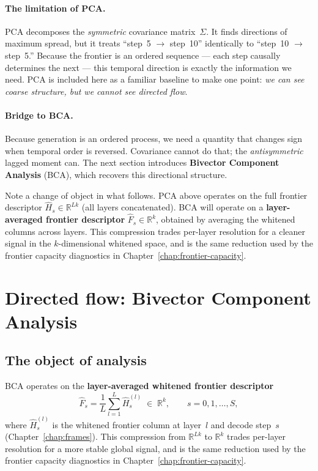 \documentclass[11pt, twoside, openright]{memoir}
\numberwithin{equation}{chapter}
\begin{document}
\paragraph{The limitation of PCA.}
PCA decomposes the \emph{symmetric} covariance matrix~$\Sigma$.  It
finds directions of maximum spread, but it treats
``step~5 $\to$ step~10'' identically to ``step~10 $\to$ step~5.''
Because the frontier is an ordered sequence --- each step causally
determines the next --- this temporal direction is exactly the
information we need.  PCA is included here as a familiar baseline to
make one point: \emph{we can see coarse structure, but we cannot
see directed flow}.

\paragraph{Bridge to BCA.}
Because generation is an ordered process, we need a quantity that
changes sign when temporal order is reversed.  Covariance cannot do
that; the \emph{antisymmetric} lagged moment can.  The next section
introduces \textbf{Bivector Component Analysis} (BCA), which
recovers this directional structure.

Note a change of object in what follows.  PCA above operates on the
full frontier descriptor $\hat{H}_s \in \mathbb{R}^{Lk}$ (all layers
concatenated).  BCA will operate on a \textbf{layer-averaged
frontier descriptor} $\hat{F}_s \in \mathbb{R}^k$, obtained by
averaging the whitened columns across layers.  This compression
trades per-layer resolution for a cleaner signal in the
$k$-dimensional whitened space, and is the same reduction used by the
frontier capacity diagnostics in Chapter~\ref{chap:frontier-capacity}.


\section{Directed flow: Bivector Component Analysis}
\label{sec:pred-bca}

\subsection*{The object of analysis}

BCA operates on the \textbf{layer-averaged whitened frontier
descriptor}
\begin{equation}\label{eq:bca-object}
  \hat{F}_s = \frac{1}{L}\sum_{l=1}^{L} \hat{H}^{(l)}_s
  \;\in\; \mathbb{R}^k, \qquad s = 0, 1, \ldots, S,
\end{equation}
where $\hat{H}^{(l)}_s$ is the whitened frontier column at layer~$l$
and decode step~$s$ (Chapter~\ref{chap:frames}).  This compression
from $\mathbb{R}^{Lk}$ to $\mathbb{R}^k$ trades per-layer resolution
for a more stable global signal, and is the same reduction used by
the frontier capacity diagnostics in
Chapter~\ref{chap:frontier-capacity}.
\end{document}
